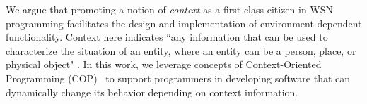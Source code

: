 \marginpar{

}

We argue that promoting a notion of \emph{context} as a first-class
citizen in WSN programming facilitates the design and implementation
of environment-dependent functionality. Context here indicates ``any
information that can be used to characterize the situation of an
entity, where an entity can be a person, place, or physical object"
\cite{dey99}. In this work, we leverage concepts of Context-Oriented
Programming (COP)~\cite{hirschfeld08} to support programmers in
developing software that can dynamically change its behavior depending
on context
information. %


